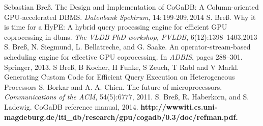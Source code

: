 Sebastian Bre{ß}. The Design and Implementation of CoGaDB: A Column-oriented GPU-accelerated DBMS. \emph{Datenbank Spektrum}, $14:199\text{-}209,2014$ 
  S. Breß. Why it is time for a HyPE: A hybrid query processing engine for efficient
GPU coprocessing in dbms. \emph{The VLDB PhD workshop, PVLDB}, 6(12):1398–1403,2013
 S. Breß, N. Siegmund, L. Bellatreche, and G. Saake. An operator-stream-based
scheduling engine for effective GPU coprocessing. In \emph{ADBIS}, pages 288–301. Springer, 2013.
 S Breß, B Kocher, H Funke, S Zeuch, T Rabl and V Markl. Generating Custom Code for Efficient Query Execution on Heterogeneous Processors
S. Borkar and A. A. Chien. The future of microprocessors. \emph{Communications of the
ACM}, 54(5):6777, 2011.
S. Breß, R. Haberkorn, and S. Ladewig. CoGaDB reference manual, 2014. \textbf{http://wwwiti.cs.uni-magdeburg.de/iti\_db/research/gpu/cogadb/0.3/doc/refman.pdf.}